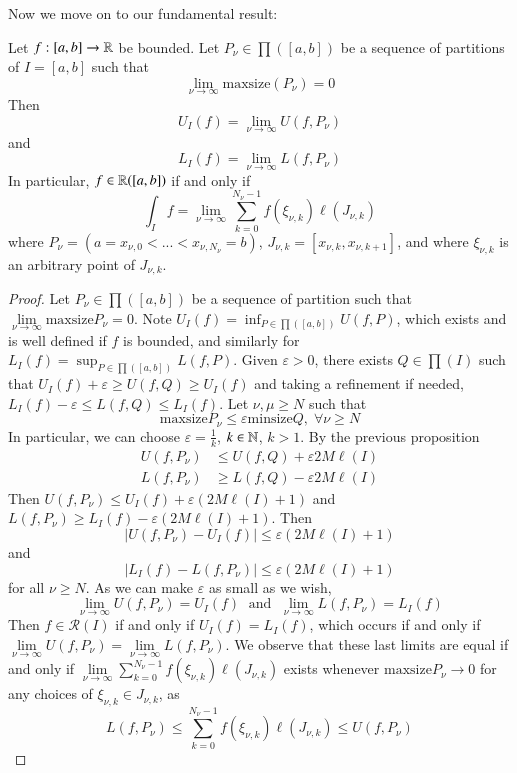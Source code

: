 Now we move on to our fundamental result:

\begin{theorem}
    Let $f:[a,b]\rightarrow \mathbb R$ be bounded. Let $P_{\nu} \in \prod([a,b])$ be a sequence of partitions of $I=[a,b]$ such that $$\lim\limits_{\nu\rightarrow \infty}\text{maxsize}(P_{\nu}) = 0$$ Then $$U_I(f) = \lim\limits_{\nu\rightarrow \infty}U(f,P_{\nu})$$ and $$L_I(f) = \lim\limits_{\nu\rightarrow \infty}L(f,P_{\nu})$$ In particular, $f \in \mathbb R([a,b])$ if and only if $$\int_If = \lim\limits_{\nu\rightarrow \infty}\sum_{k=0}^{N_{\nu}-1}f(\xi_{\nu,k})\ell(J_{\nu,k})$$ where $P_{\nu} = (a=x_{\nu,0} < ... < x_{\nu,N_{\nu}}=b)$, $J_{\nu,k} = [x_{\nu,k},x_{\nu,k+1}]$, and where $\xi_{\nu,k}$ is an arbitrary point of $J_{\nu,k}$.
\end{theorem}
\begin{proof}
    Let $P_{\nu} \in \prod([a,b])$ be a sequence of partition such that $\lim\limits_{\nu\rightarrow \infty}\text{maxsize}P_{\nu} = 0$. Note $U_I(f) = \inf_{P\in\prod([a,b])}U(f,P)$, which exists and is well defined if $f$ is bounded, and similarly for $L_I(f) = \sup_{P \in \prod([a,b])}L(f,P)$. Given $\varepsilon > 0$, there exists $Q \in \prod(I)$ such that $U_I(f) + \varepsilon \geq U(f,Q) \geq U_I(f)$ and taking a refinement if needed, $L_I(f) - \varepsilon \leq L(f,Q) \leq L_I(f)$. Let $\nu,\mu \geq N$ such that $$\text{maxsize}P_{\nu} \leq \varepsilon\text{minsize}Q,\;\forall\nu\geq N$$ In particular, we can choose $\varepsilon = \frac{1}{k}$, $k \in \mathbb N$, $k > 1$. By the previous proposition \begin{align*}
        U(f,P_{\nu}) &\leq U(f,Q) + \varepsilon 2M\ell(I) \\
        L(f,P_{\nu}) &\geq L(f,Q) - \varepsilon 2M\ell(I)
    \end{align*}
    Then $U(f,P_{\nu}) \leq U_I(f) + \varepsilon(2M\ell(I)+1)$ and $L(f,P_{\nu}) \geq L_I(f) - \varepsilon(2M\ell(I)+1)$. Then $$|U(f,P_{\nu}) - U_I(f)| \leq \varepsilon(2M\ell(I)+1)$$ and $$|L_I(f) - L(f,P_{\nu})| \leq \varepsilon(2M\ell(I)+1)$$ for all $\nu \geq N$. As we can make $\varepsilon$ as small as we wish, $$\lim\limits_{\nu\rightarrow \infty}U(f,P_{\nu}) = U_I(f)\;\text{ and }\;\lim\limits_{\nu\rightarrow \infty}L(f,P_{\nu}) = L_I(f)$$ Then $f \in \mathcal{R}(I)$ if and only if $U_I(f) = L_I(f)$, which occurs if and only if $\lim\limits_{\nu\rightarrow \infty}U(f,P_{\nu}) = \lim\limits_{\nu\rightarrow \infty}L(f,P_{\nu})$. We observe that these last limits are equal if and only if $\lim\limits_{\nu\rightarrow \infty}\sum_{k=0}^{N_{\nu}-1}f(\xi_{\nu,k})\ell(J_{\nu,k})$ exists whenever $\text{maxsize}P_{\nu}\rightarrow 0$ for any choices of $\xi_{\nu,k} \in J_{\nu,k}$, as \begin{equation*}
        L(f,P_{\nu}) \leq \sum_{k=0}^{N_{\nu}-1}f(\xi_{\nu,k})\ell(J_{\nu,k}) \leq U(f,P_{\nu})
    \end{equation*}
\end{proof}



